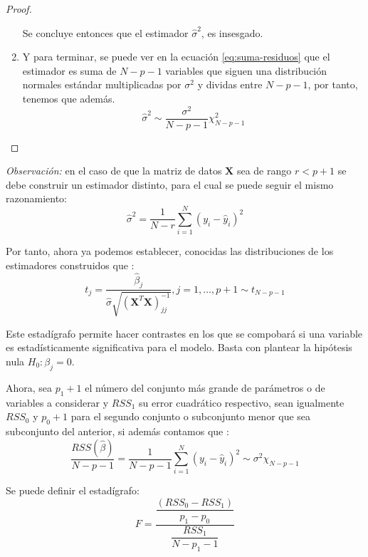 \begin{propo}
\begin{proof}
\begin{enumerate}
\noindent Se concluye entonces que el estimador $\hat{\sigma}^2$, es insesgado. 
\item \noindent Y para terminar, se puede ver en la ecuación \ref{eq:suma-residuos}  que el estimador es suma de $N-p-1$ variables que siguen una distribución normales estándar multiplicadas por $\sigma^2$ y dividas entre $N-p-1$, por tanto, tenemos que además.
\begin{equation}
\hat{\sigma}^2\sim \dfrac{\sigma^2}{N-p-1}\chi^2_{N-p-1}
\end{equation}
\end{enumerate}
\end{proof}
\end{propo}

\noindent \emph{Observación: } en el caso de que la matriz de datos $\mathbf{X}$ sea de rango $r<p+1$ se debe construir un estimador distinto, para el cual se puede seguir el mismo razonamiento:
\begin{equation}
\hat{\sigma}^2=\dfrac{1}{N-r}\sum_{i=1}^{N}(y_i-\hat{y}_i)^2
\end{equation}

\noindent Por tanto, ahora ya podemos establecer, conocidas las distribuciones de los estimadores construidos que \cite{Greene 2008,Hastie 2001}:
\begin{equation}
t_j=\dfrac{\hat{\beta}_j}{\hat{\sigma}\sqrt{(\mathbf{X}^T\mathbf{X})^{-1}_{jj}}}, j=1,\ldots ,p+1 \sim t_{N-p-1}
\end{equation}

\noindent Este estadígrafo permite hacer contrastes en los que se compobará si una variable es estadísticamente significativa para el modelo. Basta con plantear la hipótesis nula $H_0: \beta_j=0$. 

\noindent Ahora, sea $p_1+1$ el número del conjunto más grande de parámetros o de variables a considerar y $RSS_1$ su error cuadrático respectivo, sean igualmente $RSS_0$ y $p_0+1$ para el segundo conjunto o subconjunto menor que sea subconjunto del anterior, si además contamos que :
\begin{equation}\label{eq: RSS distribucion}
\frac{RSS(\hat{\beta})}{N-p-1}=\frac{1}{N-p-1}\sum_{i=1}^N(y_i-\hat{y}_i)^2\sim \sigma^2 \chi_{N-p-1}
\end{equation}

\noindent Se puede definir el estadígrafo: 
\begin{equation}\label{ec.F}
F=\dfrac{\dfrac{(RSS_0-RSS_1)}{p_1-p_0}}{\dfrac{RSS_1}{N-p_1-1}} 
\end{equation}

